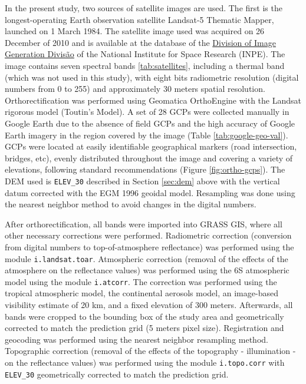 In the present study, two sources of satellite images are used. The first is the longest-operating Earth observation satellite Landsat-5 Thematic Mapper, launched on 1 March 1984. The satellite image used was acquired on 26 December of 2010 and is available at the database of the \href{http://www.dgi.inpe.br/CDSR/}{Division of Image Generation Divisão} of the National Institute for Space Research (INPE). The image contains seven spectral bands \ref{tab:satellites}, including a thermal band (which was not used in this study), with eight bits radiometric resolution (digital numbers from 0 to 255) and approximately 30 meters spatial resolution. Orthorectification was performed using Geomatica\textregistered{} OrthoEngine\textregistered{} with the Landsat rigorous model (Toutin's Model). A set of 28 GCPs were collected manually in Google Earth\textregistered{} due to the absence of field GCPs and the high accuracy of Google Earth\textregistered{} imagery in the region covered by the image (Table \ref{tab:google-geo-val}). GCPs were located at easily identifiable geographical markers (road intersection, bridges, etc), evenly distributed throughout the image and covering a variety of elevations, following standard recommendations \cite{PCIGeomatics2007} (Figure \ref{fig:ortho-gcps}). The DEM used is \texttt{ELEV\_30} described in Section \ref{sec:dem} above with the vertical datum corrected with the EGM 1996 geoidal model. Resampling was done using the nearest neighbor method to avoid changes in the digital numbers.


After orthorectification, all bands were imported into GRASS GIS, where all other necessary corrections were performed. Radiometric correction (conversion from digital numbers to top-of-atmosphere reflectance) was performed using the module \texttt{i.landsat.toar}. Atmospheric correction (removal of the effects of the atmosphere on the reflectance values) was performed using the 6S atmospheric model \cite{VermoteEtAl1997} using the module \texttt{i.atcorr}. The correction was performed using the tropical atmospheric model, the continental aerosols model, an image-based visibility estimate of 20 km, and a fixed elevation of 300 meters. Afterwards, all bands were cropped to the bounding box of the study area and geometrically corrected to match the prediction grid (5 meters pixel size). Registration and geocoding was performed using the nearest neighbor resampling method. Topographic correction (removal of the effects of the topography - illumination - on the reflectance values) was performed using the module \texttt{i.topo.corr} with \texttt{ELEV\_30} geometrically corrected to match the prediction grid.

